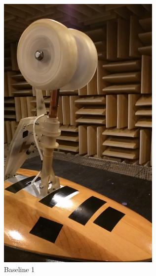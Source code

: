 \begin{figure}
\begin{center}
\begin{subfigure}{0.45\textwidth}
\includegraphics[width=\linewidth]{figures/model1a}
\caption{Baseline 1}
\label{fig:mod1a}
\end{subfigure}
\hspace*{\fill} %
\begin{subfigure}{0.45\textwidth}

\end{subfigure}
\end{center}
\end{figure}
